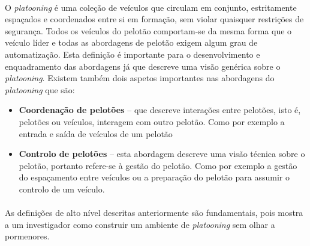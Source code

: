 \paragraph{}
O \textit{platooning} é uma coleção de veículos que circulam em conjunto, estritamente espaçados e coordenados entre si em formação, sem violar quaisquer restrições de segurança. Todos os veículos  do pelotão comportam-se da mesma forma que o veículo líder e todas as abordagens de pelotão exigem algum grau de automatização. Esta definição é importante para o desenvolvimento e enquadramento das abordagens já que descreve uma visão genérica sobre o \textit{platooning}.\vspace{5mm} 
Existem também dois aspetos importantes nas abordagens do  \textit{platooning} que são:
\begin{itemize}
\item \textbf{Coordenação de pelotões} – que descreve interações entre pelotões, isto é, pelotões ou veículos, interagem com outro pelotão. Como por exemplo a entrada e saída de veículos de um pelotão
\item \textbf{Controlo de pelotões} – esta abordagem descreve uma visão técnica sobre o pelotão, portanto refere-se à gestão do pelotão. Como por exemplo a gestão do espaçamento entre veículos ou a preparação do pelotão para assumir o controlo de um veículo. 
\end{itemize}
\paragraph{}
As definições de alto nível descritas anteriormente são fundamentais, pois mostra a um investigador  como construir um ambiente de \textit{platooning} sem olhar a pormenores.